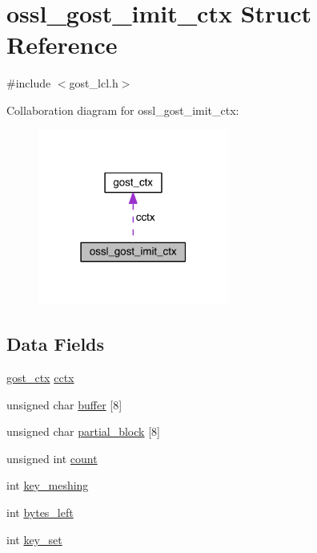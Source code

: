 \hypertarget{structossl__gost__imit__ctx}{}\section{ossl\+\_\+gost\+\_\+imit\+\_\+ctx Struct Reference}
\label{structossl__gost__imit__ctx}


{\ttfamily \#include $<$gost\+\_\+lcl.\+h$>$}



Collaboration diagram for ossl\+\_\+gost\+\_\+imit\+\_\+ctx\+:\nopagebreak
\begin{figure}[H]
\begin{center}
\leavevmode
\includegraphics[width=178pt]{structossl__gost__imit__ctx__coll__graph}
\end{center}
\end{figure}
\subsection*{Data Fields}
\begin{DoxyCompactItemize}
\item 
\hyperlink{structgost__ctx}{gost\+\_\+ctx} \hyperlink{structossl__gost__imit__ctx_a4536f57bd141b77644121499b784cabf}{cctx}
\item 
unsigned char \hyperlink{structossl__gost__imit__ctx_ad1369d5565262307a4ba9a32a3d94c60}{buffer} \mbox{[}8\mbox{]}
\item 
unsigned char \hyperlink{structossl__gost__imit__ctx_a389f595c2c3b632af351f6e25abc4ccd}{partial\+\_\+block} \mbox{[}8\mbox{]}
\item 
unsigned int \hyperlink{structossl__gost__imit__ctx_a16ff2d8e15ade4948398b0aeb80124a8}{count}
\item 
int \hyperlink{structossl__gost__imit__ctx_a0d26c1455c49156afaa4c8194010ed56}{key\+\_\+meshing}
\item 
int \hyperlink{structossl__gost__imit__ctx_a84670bca2a6456b731d2b2e4dd2e162d}{bytes\+\_\+left}
\item 
int \hyperlink{structossl__gost__imit__ctx_a77761b1f4ad7895ba894c134c03b98df}{key\+\_\+set}
\end{DoxyCompactItemize}


